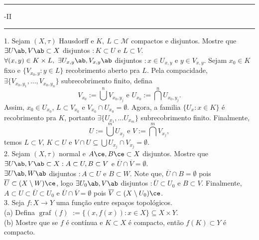 \newcommand{\F}{\mathbb{F}}
\newcommand{\C}{\mathbb{C}}
\newcommand{\an}{\mathscr{A}} 
\newcommand{\Q}{\mathbb{Q}}
\renewcommand{\hom}{\operatorname{Hom}}
\newcommand{\ehom}{\operatorname{End}}

\-\vspace{-0.3cm}
  {\hrule \vspace{-0.15cm}
  -II \vspace{0.1cm}
  \hrule}

1. Sejam \((X, \tau)\) Hausdorff e \(K, \ L \subset \mathcal{M}\) compactos e disjuntos. Mostre que \(\exists U\ab, V\ab \subset X\) disjuntos \(: K\subset U\) e \(L\subset V\). \\
\textcolor{gris}{
  \(\forall (x,y) \in K \times  L, \ \exists U_{x,y}\ab, V_{x,y}\ab\) disjuntos \(: x \in U_{x,y}\) e \(y\in V_{x,y}\). Sejam \(x_0 \in K\) fixo e \(\{V_{x_0, y} : y \in L\}\) recobrimento aberto pra \(L\). Pela compacidade, \(\exists \{V_{x_0, y_1}, \ldots, V_{x_0, y_n} \}\) subrecobrimento finito, defina
  \[V_{x_0} := \bigcup^n V_{x_0,y_j} \text{\ \ e \ \ } U_{x_0} := \bigcap^n U_{x_0,y_j}. \]
  Assim, \(x_0 \in U_{x_0}\), \(L \subset V_{x_0}\) e \(V_{x_0} \cap U_{x_0} = \emptyset \). Agora, a familia \(\{U_x : x \in K\}\) é recobrimento pra \(K\), portanto \(\exists \{U_{x_1}, \ldots U_{x_m}\}\) subrecobrimento finito. Finalmente, 
  \[U := \bigcup^m U_{x_j} \text{ \ \ e \ \ } V := \bigcap^m V_{x_j},\]
  temos \(L\subset V\), \(K\subset U\) e \(V\cap U \subseteq \bigcup U_{x_j}\cap V_{x_j} = \emptyset\). 
} \\
2. Sejam \((X, \tau)\) normal e \(A\ce,B\ce\subset X\) disjuntos. Mostre que \(\exists U\ab, V\ab \subset X : A \subset U, B\subset V\) e \(\overline{U} \cap \overline{V} = \emptyset\). \\ 
\textcolor{gris}{
  \(\exists U\ab, W\ab\) disjuntos \(: A \subset U\) e \(B\subset W\). Note que, \(\overline{U} \cap B = \emptyset\) pois \(\overline{U} \subset (X\setminus W)\ce\), logo \(\exists U_0\ab,  V\ab\) disjuntos \(: \overline{U}\subset U_0\) e \(B\subset V\). Finalmente, \(A \subset U \subset \overline{U} \subset U_0 \) e \(\overline{U} \cap \overline{V} = \emptyset \)  pois \(\overline{V}\subset (X\setminus U_0)\ce\).   
}\\ 
3. Seja \(f: X\to Y\) uma função entre espaços topológicos. \\ 
(a) Defina \(\operatorname{graf}(f)\) \textcolor{gris}{\(:= \{(x,f(x)) : x \in X\}\subseteq X\times Y \). }  \\
(b) Mostre que se \(f\) é contínua e \(K\subset X\) é compacto, então \(f(K)\subset Y\) é compacto. \\ 
